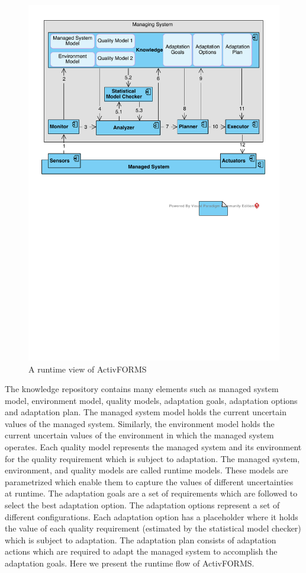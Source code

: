 \documentclass[a4paper,12pt]{article}
\begin{document}
\begin{figure}[H]
	\centering
	\includegraphics[keepaspectratio, width=\linewidth]{figures/ActivFORMSRuntimeView.pdf}
	\caption{A runtime view of ActivFORMS}
	\label{ActivFORMSRuntimeView}
\end{figure} 
The knowledge repository contains many elements such as managed system model, environment model, quality models, adaptation goals, adaptation options and adaptation plan. The managed system model holds the current uncertain values of the managed system. Similarly, the environment model holds the current uncertain values of the environment in which the managed system operates. Each quality model represents the managed system and its environment for the quality requirement which is subject to adaptation. The managed system, environment, and quality models are called runtime models. These models are parametrized which enable them to capture the values of different uncertainties at runtime. The adaptation goals are a set of requirements which are followed to select the best adaptation option. The adaptation options represent a set of different configurations. Each adaptation option has a placeholder where it holds the value of each quality requirement (estimated by the statistical model checker) which is subject to adaptation. The adaptation plan consists of adaptation actions which are required to adapt the managed system to accomplish the adaptation goals. Here we present the runtime flow of ActivFORMS.
\end{document}
